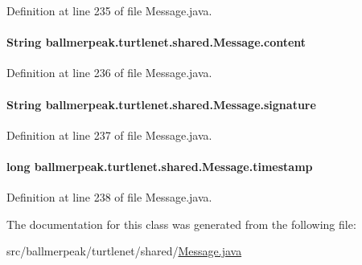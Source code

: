 Definition at line 235 of file Message.\-java.

\hypertarget{classballmerpeak_1_1turtlenet_1_1shared_1_1Message_a88b89de79f9fec571a22623688697de9}{
\paragraph[{content}]{\setlength{\rightskip}{0pt plus 5cm}String ballmerpeak.\-turtlenet.\-shared.\-Message.\-content}}\label{classballmerpeak_1_1turtlenet_1_1shared_1_1Message_a88b89de79f9fec571a22623688697de9}


Definition at line 236 of file Message.\-java.

\hypertarget{classballmerpeak_1_1turtlenet_1_1shared_1_1Message_a71a41cba8610df3d655b4b417a0361bc}{
\paragraph[{signature}]{\setlength{\rightskip}{0pt plus 5cm}String ballmerpeak.\-turtlenet.\-shared.\-Message.\-signature}}\label{classballmerpeak_1_1turtlenet_1_1shared_1_1Message_a71a41cba8610df3d655b4b417a0361bc}


Definition at line 237 of file Message.\-java.

\hypertarget{classballmerpeak_1_1turtlenet_1_1shared_1_1Message_acc5644d2bce101cdcc576cb1b87cdf70}{
\paragraph[{timestamp}]{\setlength{\rightskip}{0pt plus 5cm}long ballmerpeak.\-turtlenet.\-shared.\-Message.\-timestamp}}\label{classballmerpeak_1_1turtlenet_1_1shared_1_1Message_acc5644d2bce101cdcc576cb1b87cdf70}


Definition at line 238 of file Message.\-java.



The documentation for this class was generated from the following file\-:\begin{DoxyCompactItemize}
\item 
src/ballmerpeak/turtlenet/shared/\hyperlink{Message_8java}{Message.\-java}\end{DoxyCompactItemize}
